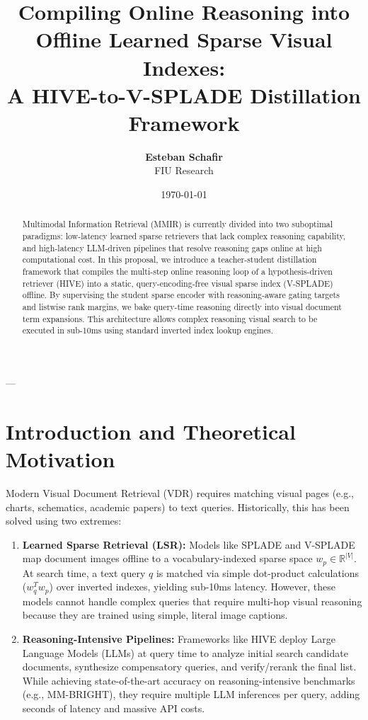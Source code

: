 \documentclass[11pt,a4paper]{article}
\title{\textbf{Compiling Online Reasoning into Offline Learned Sparse Visual Indexes:\\A HIVE-to-V-SPLADE Distillation Framework}}
\author{\textbf{Esteban Schafir} \\ FIU Research}
\date{\today}
\begin{document}
\maketitle

\begin{abstract}
Multimodal Information Retrieval (MMIR) is currently divided into two suboptimal paradigms: low-latency learned sparse retrievers that lack complex reasoning capability, and high-latency LLM-driven pipelines that resolve reasoning gaps online at high computational cost. In this proposal, we introduce a teacher-student distillation framework that compiles the multi-step online reasoning loop of a hypothesis-driven retriever (HIVE) into a static, query-encoding-free visual sparse index (V-SPLADE) offline. By supervising the student sparse encoder with reasoning-aware gating targets and listwise rank margins, we bake query-time reasoning directly into visual document term expansions. This architecture allows complex reasoning visual search to be executed in sub-10ms using standard inverted index lookup engines.
\end{abstract}

---

\section{Introduction and Theoretical Motivation}
Modern Visual Document Retrieval (VDR) requires matching visual pages (e.g., charts, schematics, academic papers) to text queries. Historically, this has been solved using two extremes:
\begin{enumerate}
    \item \textbf{Learned Sparse Retrieval (LSR):} Models like SPLADE and V-SPLADE map document images offline to a vocabulary-indexed sparse space $w_p \in \mathbb{R}^{|V|}$. At search time, a text query $q$ is matched via simple dot-product calculations ($w_q^T w_p$) over inverted indexes, yielding sub-10ms latency. However, these models cannot handle complex queries that require multi-hop visual reasoning because they are trained using simple, literal image captions.
    \item \textbf{Reasoning-Intensive Pipelines:} Frameworks like HIVE deploy Large Language Models (LLMs) at query time to analyze initial search candidate documents, synthesize compensatory queries, and verify/rerank the final list. While achieving state-of-the-art accuracy on reasoning-intensive benchmarks (e.g., MM-BRIGHT), they require multiple LLM inferences per query, adding seconds of latency and massive API costs.
\end{enumerate}
\end{document}
